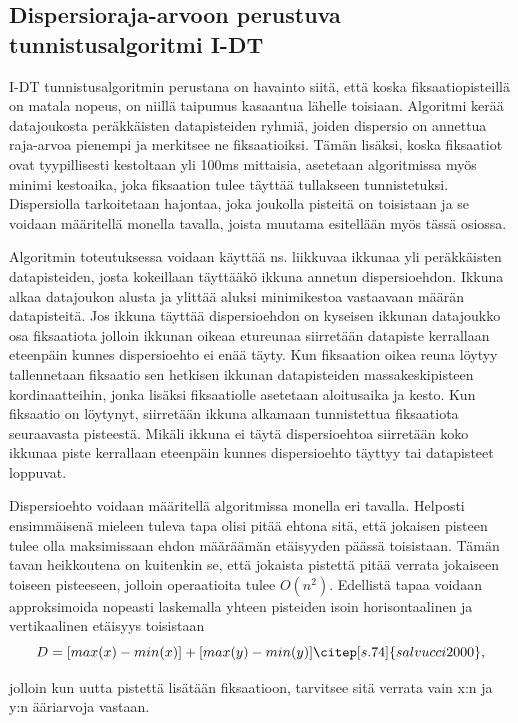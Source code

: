 \subsection{Dispersioraja-arvoon perustuva tunnistusalgoritmi I-DT}
I-DT tunnistusalgoritmin perustana on havainto siitä, että koska fiksaatiopisteillä on matala nopeus, on niillä taipumus kasaantua lähelle toisiaan. Algoritmi kerää datajoukosta peräkkäisten datapisteiden ryhmiä, joiden dispersio on annettua raja-arvoa pienempi ja merkitsee ne fiksaatioiksi. Tämän lisäksi, koska fiksaatiot ovat tyypillisesti kestoltaan yli 100ms mittaisia, asetetaan algoritmissa myös minimi kestoaika, joka fiksaation tulee täyttää tullakseen tunnistetuksi. \citep[s. 74]{salvucci2000} Dispersiolla tarkoitetaan hajontaa, joka joukolla pisteitä on toisistaan ja se voidaan määritellä monella tavalla, joista muutama esitellään myös tässä osiossa.

Algoritmin toteutuksessa voidaan käyttää ns. liikkuvaa ikkunaa yli peräkkäisten datapisteiden, josta kokeillaan täyttääkö ikkuna annetun dispersioehdon. Ikkuna alkaa datajoukon alusta ja ylittää aluksi minimikestoa vastaavaan määrän datapisteitä. Jos ikkuna täyttää dispersioehdon on kyseisen ikkunan datajoukko osa fiksaatiota jolloin ikkunan oikeaa etureunaa siirretään datapiste kerrallaan eteenpäin kunnes dispersioehto ei enää täyty. Kun fiksaation oikea reuna löytyy tallennetaan fiksaatio sen hetkisen ikkunan datapisteiden massakeskipisteen kordinaatteihin, jonka lisäksi fiksaatiolle asetetaan aloitusaika ja kesto. Kun fiksaatio on löytynyt, siirretään ikkuna alkamaan tunnistettua fiksaatiota seuraavasta pisteestä. Mikäli ikkuna ei täytä dispersioehtoa siirretään koko ikkunaa piste kerrallaan eteenpäin kunnes dispersioehto täyttyy tai datapisteet loppuvat. \citep[s.26-27]{gale1984}

Dispersioehto voidaan määritellä algoritmissa monella eri tavalla. Helposti ensimmäisenä mieleen tuleva tapa olisi pitää ehtona sitä, että jokaisen pisteen tulee olla maksimissaan ehdon määräämän etäisyyden päässä toisistaan. Tämän tavan heikkoutena on kuitenkin se, että jokaista pistettä pitää verrata jokaiseen toiseen pisteeseen, jolloin operaatioita tulee \(O(n^2)\). \citep[s.111] {shic2008} Edellistä tapaa voidaan approksimoida nopeasti laskemalla yhteen pisteiden isoin horisontaalinen ja vertikaalinen etäisyys toisistaan 
\[
D = [max(x) - min(x)] + [max(y) - min(y)]  \citep[s. 74]{salvucci2000},
\]

jolloin kun uutta pistettä lisätään fiksaatioon, tarvitsee sitä verrata vain x:n ja y:n ääriarvoja vastaan.

